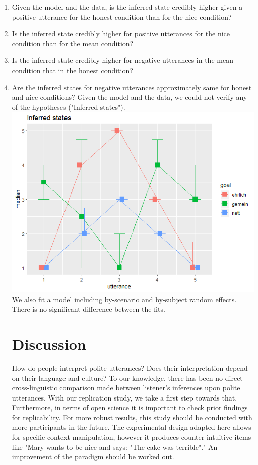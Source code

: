 \documentclass[a4paper,11pt]{article}
\begin{document}
\begin{enumerate}
\item Given the model and the data, is the inferred state credibly higher given a positive utterance for the honest condition than for the nice condition?
\item  Is the inferred state credibly higher for positive utterances for the nice condition than for the mean condition?
\item Is the inferred state credibly higher for negative utterances in the mean condition that in the honest condition?
\item Are the inferred states for negative utterances approximately same for honest and nice conditions?
Given the model and the data, we could not verify any of the hypotheses ("Inferred states").
\\
\includegraphics[width=15cm]{final_report/inferred-states.png} 
\\
We also fit a model including by-scenario and by-subject random effects. There is no significant difference between the fits.

\section{Discussion}
How do people interpret polite utterances? Does their interpretation depend on their language and culture? To our knowledge, there has been no direct cross-linguistic comparison made between listener's inferences upon polite utterances. With our replication study, we take a first step towards that. Furthermore, in terms of open science it is important to check prior findings for replicability. For more robust results, this study should be conducted with more participants in the future. The experimental design adapted here allows for specific context manipulation, however it produces counter-intuitive items like "Mary wants to be nice and says: "The cake was terrible"." An improvement of the paradigm should be worked out. 

\end{enumerate}
\end{document}
